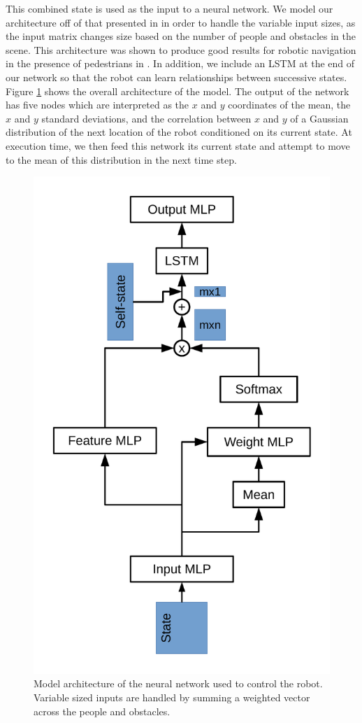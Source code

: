 \documentclass[letterpaper, 10 pt, conference]{ieeeconf}  %
\begin{document}
	This combined state is used as the input to a neural network. We model our architecture off of that presented in \cite{crowdawarerl} in order to handle the variable input sizes, as the input matrix changes size based on the number of people and obstacles in the scene. This architecture was shown to produce good results for robotic navigation in the presence of pedestrians in \cite{crowdawarerl}. In addition, we include an LSTM at the end of our network so that the robot can learn relationships between successive states. Figure \ref{fig:model_arch} shows the overall architecture of the model. The output of the network has five nodes which are interpreted as the $x$ and $y$ coordinates of the mean, the $x$ and $y$ standard deviations, and the correlation between $x$ and $y$ of a Gaussian distribution of the next location of the robot conditioned on its current state. At execution time, we then feed this network its current state and attempt to move to the mean of this distribution in the next time step.
	
	\begin{figure}
		\centering
		\includegraphics[height=\linewidth, angle=270]{model_arch.pdf}
		\caption{Model architecture of the neural network used to control the robot. Variable sized inputs are handled by summing a weighted vector across the people and obstacles.}
		\label{fig:model_arch}
	\end{figure}
\end{document}
